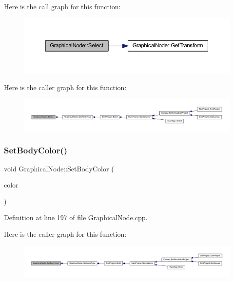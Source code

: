 Here is the call graph for this function\+:
\nopagebreak
\begin{figure}[H]
\begin{center}
\leavevmode
\includegraphics[width=350pt]{class_graphical_node_ac73e20f3d4c5cca556e0140ef558f6a4_cgraph}
\end{center}
\end{figure}
Here is the caller graph for this function\+:
\nopagebreak
\begin{figure}[H]
\begin{center}
\leavevmode
\includegraphics[width=350pt]{class_graphical_node_ac73e20f3d4c5cca556e0140ef558f6a4_icgraph}
\end{center}
\end{figure}
\mbox{\label{class_graphical_node_ae0cbf2cfe00306e2cfc610c5eb4cb89b}} 
\subsubsection{\texorpdfstring{Set\+Body\+Color()}{SetBodyColor()}}
{\footnotesize\ttfamily void Graphical\+Node\+::\+Set\+Body\+Color (\begin{DoxyParamCaption}\item[{const wx\+Color \&}]{color }\end{DoxyParamCaption})}



Definition at line 197 of file Graphical\+Node.\+cpp.

Here is the caller graph for this function\+:
\nopagebreak
\begin{figure}[H]
\begin{center}
\leavevmode
\includegraphics[width=350pt]{class_graphical_node_ae0cbf2cfe00306e2cfc610c5eb4cb89b_icgraph}
\end{center}
\end{figure}
\mbox{\label{class_graphical_node_a036c1cc48701511037e50bc74fd8d430}} 
